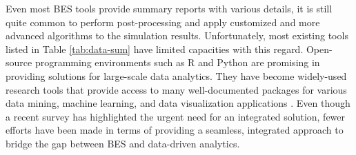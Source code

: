 \documentclass[3p, times]{elsarticle} %
\begin{document}
Even most BES tools provide summary reports with various details, it is still
quite common to perform post-processing and apply customized and more advanced
algorithms to the simulation results.
Unfortunately, most existing tools listed in Table \ref{tab:data-sum}
have limited capacities with this regard.
Open-source programming environments such as R \citep{RCoreTeam2019} and Python
\citep{Oliphant2007} are promising in providing solutions for large-scale data
analytics. They have become widely-used research tools that provide access to
many well-documented packages for various data mining, machine learning, and
data visualization applications \citep{Lowndes2017, Molina-Solana2017}.
Even though a recent survey \citep{Srivastava2019} has highlighted the urgent need
for an integrated solution, fewer efforts have been made in terms of providing
a seamless, integrated approach to bridge the gap between BES and data-driven
analytics.
\end{document}
